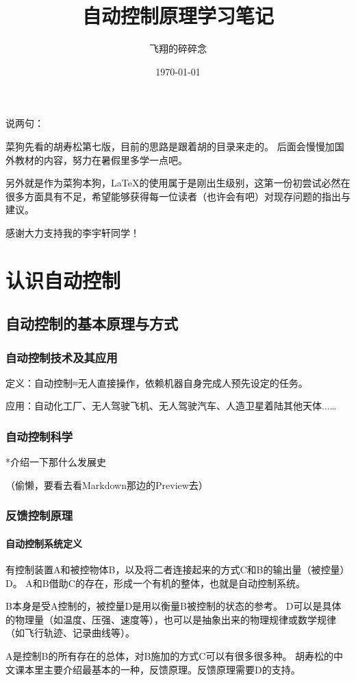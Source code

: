 \documentclass[oneside,a4paper]{ctexbook}
\title{自动控制原理学习笔记}
\author{飞翔的碎碎念}
\date{\today}
\begin{document}
\maketitle

说两句：

菜狗先看的胡寿松第七版，目前的思路是跟着胡的目录来走的。
后面会慢慢加国外教材的内容，努力在暑假里多学一点吧。

另外就是作为菜狗本狗，\LaTeX 的使用属于是刚出生级别，这第一份初尝试必然在很多方面具有不足，希望能够获得每一位读者（也许会有吧）对现存问题的指出与建议。

感谢大力支持我的李宇轩同学！

\tableofcontents

\chapter{认识自动控制}
\section{自动控制的基本原理与方式}
\subsection{自动控制技术及其应用}
定义：自动控制≈无人直接操作，依赖机器自身完成人预先设定的任务。

应用：自动化工厂、无人驾驶飞机、无人驾驶汽车、人造卫星着陆其他天体...\dots
\subsection{自动控制科学}
*介绍一下那什么发展史

（偷懒，要看去看Markdown那边的Preview去）

\subsection{反馈控制原理}
\subsubsection{自动控制系统定义}
有控制装置A和被控物体B，以及将二者连接起来的方式C和B的输出量（被控量）D。
A和B借助C的存在，形成一个有机的整体，也就是自动控制系统。

B本身是受A控制的，被控量D是用以衡量B被控制的状态的参考。
D可以是具体的物理量（如温度、压强、速度等），也可以是抽象出来的物理规律或数学规律（如飞行轨迹、记录曲线等）。

A是控制B的所有存在的总体，对B施加的方式C可以有很多很多种。
胡寿松的中文课本里主要介绍最基本的一种，反馈原理。反馈原理需要D的支持。
\end{document}
